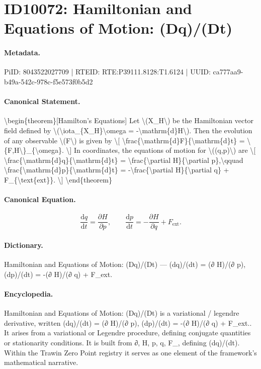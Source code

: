 \section*{ID10072: Hamiltonian and Equations of Motion: (Dq)/(Dt)}
\paragraph{Metadata.}
PiID: 8043522027709 | RTEID: RTE:P39111.8128:T1.6124 | UUID: ca777aa9-b49a-542c-978c-f5e573f0b5d2

\paragraph{Canonical Statement.}
\textbackslash{}begin\{theorem\}[Hamilton’s Equations] Let \textbackslash{}(X\_H\textbackslash{}) be the Hamiltonian vector field defined by \textbackslash{}(\textbackslash{}iota\_\{X\_H\}\textbackslash{}omega = -\textbackslash{}mathrm\{d\}H\textbackslash{}). Then the evolution of any observable \textbackslash{}(F\textbackslash{}) is given by \textbackslash{}[ \textbackslash{}frac\{\textbackslash{}mathrm\{d\}F\}\{\textbackslash{}mathrm\{d\}t\} = \textbackslash{}\{F,H\textbackslash{}\}\_\{\textbackslash{}omega\}. \textbackslash{}] In coordinates, the equations of motion for \textbackslash{}((q,p)\textbackslash{}) are \textbackslash{}[ \textbackslash{}frac\{\textbackslash{}mathrm\{d\}q\}\{\textbackslash{}mathrm\{d\}t\} = \textbackslash{}frac\{\textbackslash{}partial H\}\{\textbackslash{}partial p\},\textbackslash{}qquad \textbackslash{}frac\{\textbackslash{}mathrm\{d\}p\}\{\textbackslash{}mathrm\{d\}t\} = -\textbackslash{}frac\{\textbackslash{}partial H\}\{\textbackslash{}partial q\} + F\_\{\textbackslash{}text\{ext\}\}. \textbackslash{}] \textbackslash{}end\{theorem\}

\paragraph{Canonical Equation.}
\[
\frac{\mathrm{d}q}{\mathrm{d}t} = \frac{\partial H}{\partial p},\qquad \frac{\mathrm{d}p}{\mathrm{d}t} = -\frac{\partial H}{\partial q} + F_{\text{ext}}.
\]

\paragraph{Dictionary.}
Hamiltonian and Equations of Motion: (Dq)/(Dt) — (dq)/(dt) = (∂ H)/(∂ p), (dp)/(dt) = -(∂ H)/(∂ q) + F\_ext.

\paragraph{Encyclopedia.}
Hamiltonian and Equations of Motion: (Dq)/(Dt) is a variational / legendre derivative, written (dq)/(dt) = (∂ H)/(∂ p), (dp)/(dt) = -(∂ H)/(∂ q) + F\_ext.. It arises from a variational or Legendre procedure, defining conjugate quantities or stationarity conditions. It is built from ∂, H, p, q, F\_, defining (dq)/(dt). Within the Trawin Zero Point registry it serves as one element of the framework's mathematical narrative.
